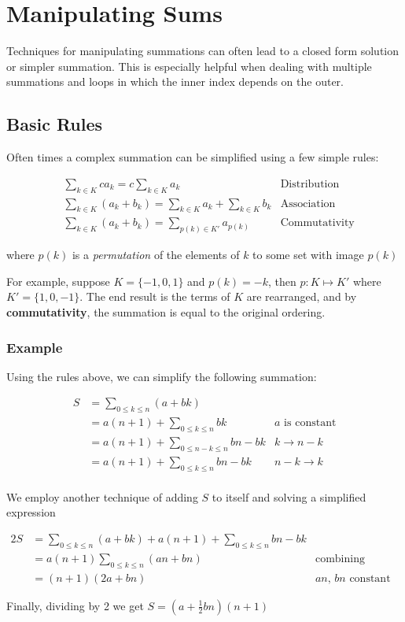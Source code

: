 \documentclass{standalone}
\begin{document}
\section{Manipulating Sums}

Techniques for manipulating summations can often lead to a closed form solution or simpler summation.
This is especially helpful when dealing with multiple summations and loops in which the inner index depends on the outer.

\subsection{Basic Rules}

Often times a complex summation can be simplified using a few simple rules:

\begin{align}
  &\sum_{k \in K} c a_k = c \sum_{k \in K} a_k &\text{Distribution} \\
  &\sum_{k \in K} (a_k + b_k) = \sum_{k \in K} a_k + \sum_{k \in K} b_k &\text{Association} \\
  &\sum_{k \in K} (a_k + b_k) = \sum_{p(k) \in K'} a_{p(k)} &\text{Commutativity}
\end{align}

where $p(k)$ is a \emph{permutation} of the elements of $k$ to some set with image $p(k)$

For example, suppose $K  = \{-1, 0, 1\}$ and $p(k) = -k$, then $p : K \mapsto K'$ where $K' = \{1, 0, -1\}$.
The end result is the terms of $K$ are rearranged, and by \textbf{commutativity}, the summation is equal to the original ordering.

\subsubsection{Example}

Using the rules above, we can simplify the following summation:

\begin{align}
  S &= \sum_{0 \leqslant k \leqslant n} (a + bk) \\
  &= a(n+1) + \sum_{0 \leqslant k \leqslant n} bk &\text{$a$ is constant} \\
  &= a(n+1) + \sum_{0 \leqslant n-k \leqslant n} bn - bk &\text{$k \to n-k$} \\
  &= a(n+1) + \sum_{0 \leqslant k \leqslant n} bn - bk &\text{$n-k \to k$} \\
\end{align}

We employ another technique of adding $S$ to itself and solving a simplified expression

\begin{align}
  2S &= \sum_{0 \leqslant k \leqslant n} (a + bk) + a(n+1) + \sum_{0 \leqslant k \leqslant n} bn - bk \\
  &= a(n+1) \sum_{0 \leqslant k \leqslant n} (an + bn) &\text{combining summations and simplifying} \\
  &= (n+1)(2a + bn) &\text{$an$, $bn$ constant}
\end{align}

Finally, dividing by 2 we get $S = (a + \frac 1 2 bn)(n+1)$
\end{document}
